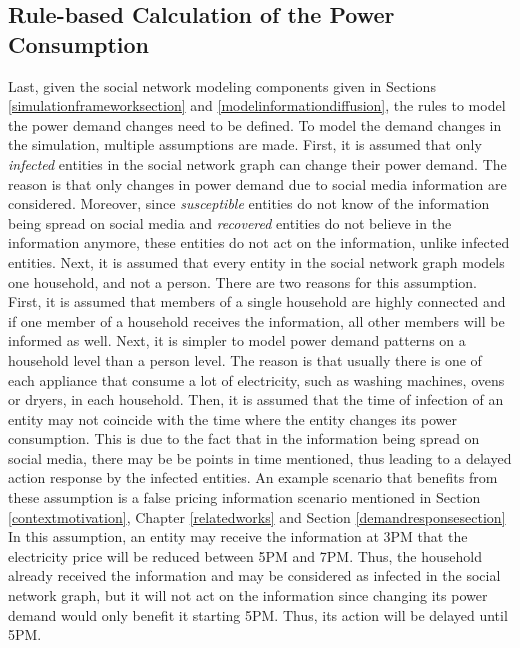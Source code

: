\subsection{Rule-based Calculation of the Power Consumption}
\label{rulebasedpowerconsumption}

Last, given the social network modeling components given in 
Sections \ref{simulationframeworksection} and 
\ref{modelinformationdiffusion}, the rules to model the
power demand changes need to be defined.
To model the demand changes in the simulation, multiple assumptions
are made.
First, it is assumed that only \textit{infected} entities in 
the social network graph
can change their power demand. The reason is 
that only changes in power demand due to social media information
are considered. Moreover, since \textit{susceptible} entities
do not know of the information being spread on social media and 
\textit{recovered} entities do not believe in the information anymore,
these entities do not act on the information, unlike infected
entities.
Next, it is assumed that every entity in the social network graph 
models one household, and not a person. There are 
two reasons for this assumption. First, it is assumed that 
members of a single household are highly connected and if one 
member of a household receives the information, all other members
will be informed as well. Next, it is simpler to model power demand
patterns on a household level than a person level. The reason
is that usually
there is one of each appliance that consume a lot of electricity, 
such as washing machines, ovens or dryers, in each household.
Then, it is assumed that the time of infection of an entity may not
coincide with the time where the entity changes its 
power consumption. This is due to the fact that in the information
being spread on social media, there may be be points in time
mentioned, thus leading to a delayed action response by the
infected entities. An example scenario that benefits
from these assumption is a false pricing information scenario 
mentioned in Section \ref{contextmotivation}, Chapter 
\ref{relatedworks} and Section \ref{demandresponsesection} 
In this assumption, an entity may receive the information 
at 3PM that the electricity price will be reduced 
between 5PM and 7PM. Thus, the household already received the
information and may be considered as infected in the social network
graph, but it will not act on the information since changing
its power demand would only benefit it starting 5PM. Thus, its 
action will be delayed until 5PM. 


